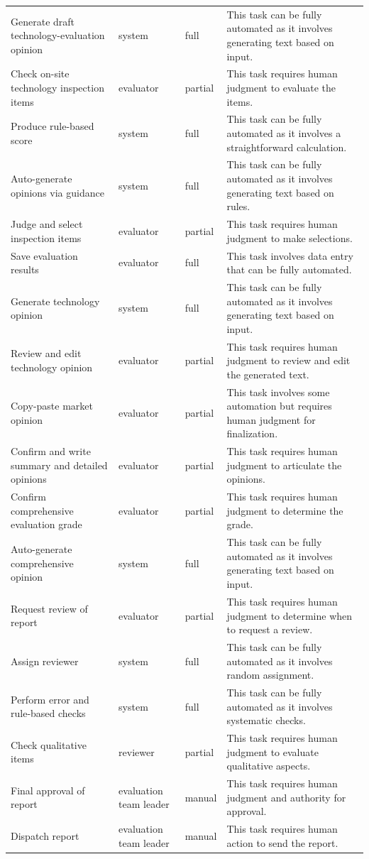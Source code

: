 \begin{longtable}{@{}p{4.4cm}p{2.6cm}p{1.4cm}p{5.2cm}@{}}
Generate draft technology-evaluation opinion & system & full & This task can be fully automated as it involves generating text based on input. \\
Check on-site technology inspection items & evaluator & partial & This task requires human judgment to evaluate the items. \\
Produce rule-based score & system & full & This task can be fully automated as it involves a straightforward calculation. \\
Auto-generate opinions via guidance & system & full & This task can be fully automated as it involves generating text based on rules. \\
Judge and select inspection items & evaluator & partial & This task requires human judgment to make selections. \\
Save evaluation results & evaluator & full & This task involves data entry that can be fully automated. \\
Generate technology opinion & system & full & This task can be fully automated as it involves generating text based on input. \\
Review and edit technology opinion & evaluator & partial & This task requires human judgment to review and edit the generated text. \\
Copy-paste market opinion & evaluator & partial & This task involves some automation but requires human judgment for finalization. \\
Confirm and write summary and detailed opinions & evaluator & partial & This task requires human judgment to articulate the opinions. \\
Confirm comprehensive evaluation grade & evaluator & partial & This task requires human judgment to determine the grade. \\
Auto-generate comprehensive opinion & system & full & This task can be fully automated as it involves generating text based on input. \\
Request review of report & evaluator & partial & This task requires human judgment to determine when to request a review. \\
Assign reviewer & system & full & This task can be fully automated as it involves random assignment. \\
Perform error and rule-based checks & system & full & This task can be fully automated as it involves systematic checks. \\
Check qualitative items & reviewer & partial & This task requires human judgment to evaluate qualitative aspects. \\
Final approval of report & evaluation team leader & manual & This task requires human judgment and authority for approval. \\
Dispatch report & evaluation team leader & manual & This task requires human action to send the report. \\
\end{longtable}